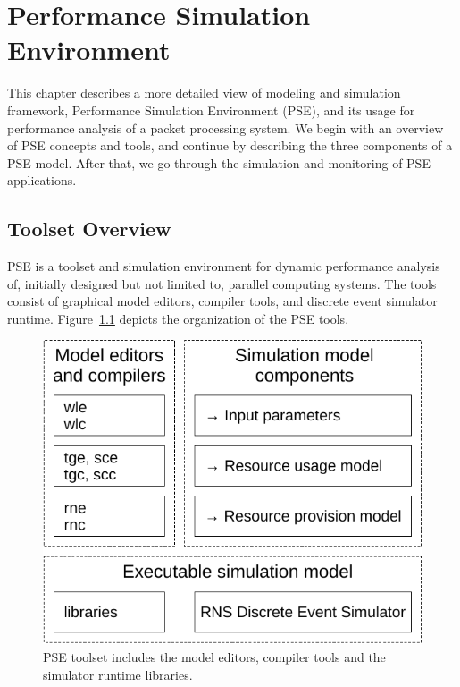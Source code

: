 \chapter{Performance Simulation Environment}
\label{chapter:performance-simulation-environment}

This chapter describes a more detailed view of modeling and simulation framework, Performance Simulation Environment (PSE), and its usage for performance analysis of a packet processing system. We begin with an overview of PSE concepts and tools, and continue by describing the three components of a PSE model. After that, we go through the simulation and monitoring of PSE applications.

\section{Toolset Overview}
\label{sec:toolset-overview}

PSE is a toolset and simulation environment for dynamic performance analysis of, initially designed but not limited to, parallel computing systems. The tools consist of graphical model editors, compiler tools, and discrete event simulator runtime. Figure~\ref{fig:pse-toolset} depicts the organization of the PSE tools.

\begin{figure}[]
  \begin{center}
    \includegraphics[width=\textwidth/2]{images/pse-toolset-overview.pdf}
    \caption{PSE toolset includes the model editors, compiler tools and the simulator runtime libraries.}
    \label{fig:pse-toolset}
  \end{center}
\end{figure}

